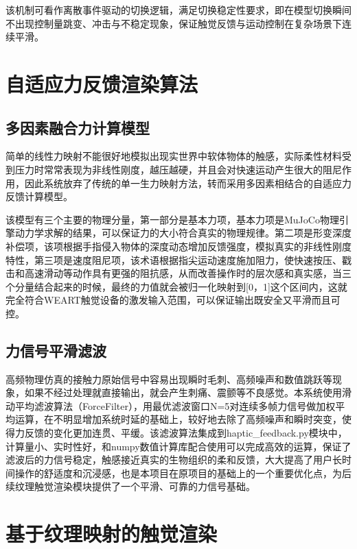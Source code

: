 该机制可看作离散事件驱动的切换逻辑，满足切换稳定性要求，即在模型切换瞬间不出现控制量跳变、冲击与不稳定现象，保证触觉反馈与运动控制在复杂场景下连续平滑。

\section{自适应力反馈渲染算法}

\subsection{多因素融合力计算模型}

简单的线性力映射不能很好地模拟出现实世界中软体物体的触感，实际柔性材料受到压力时常常表现为非线性刚度，越压越硬，并且会对快速运动产生很大的阻尼作用，因此系统放弃了传统的单一生力映射方法，转而采用多因素相结合的自适应力反馈计算模型。

该模型有三个主要的物理分量，第一部分是基本力项，基本力项是MuJoCo物理引擎动力学求解的结果，可以保证力的大小符合真实的物理规律。第二项是形变深度补偿项，该项根据手指侵入物体的深度动态增加反馈强度，模拟真实的非线性刚度特性，第三项是速度阻尼项，该术语根据指尖运动速度施加阻力，使快速按压、戳击和高速滑动等动作具有更强的阻抗感，从而改善操作时的层次感和真实感，当三个分量结合起来的时候，最终的力值就会被归一化映射到{[}0，1{]}这个区间内，这就完全符合WEART触觉设备的激发输入范围，可以保证输出既安全又平滑而且可控。

\subsection{力信号平滑滤波}

高频物理仿真的接触力原始信号中容易出现瞬时毛刺、高频噪声和数值跳跃等现象，如果不经过处理就直接输出，就会产生刺痛、震颤等不良感觉。本系统使用滑动平均滤波算法（ForceFilter），用最优滤波窗口N=5对连续多帧力信号做加权平均运算，在不明显增加系统时延的基础上，较好地去除了高频噪声和瞬时突变，使得力反馈的变化更加连贯、平缓。该滤波算法集成到haptic\_feedback.py模块中，计算量小、实时性好，和numpy数值计算库配合使用可以完成高效的运算，保证了滤波后的力信号稳定，触感接近真实的生物组织的柔和反馈，大大提高了用户长时间操作的舒适度和沉浸感，也是本项目在原项目的基础上的一个重要优化点，为后续纹理触觉渲染模块提供了一个平滑、可靠的力信号基础。

\section{基于纹理映射的触觉渲染}


